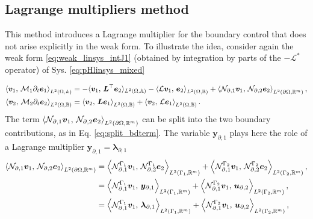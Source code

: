 \subsection{Lagrange multipliers method}\label{sec:lagrMul}
This method introduces a Lagrange multiplier for the boundary control that does not arise explicitly in the weak form. To illustrate the idea, consider again the weak form \ref{eq:weak_linsys_intJ1} (obtained by integration by parts of the $\mathcal{-L^*}$ operator) of Sys. \ref{eq:pHlinsys_mixed}

\begin{equation}\label{eq:pHlinsys_mixed_weak}
\begin{aligned}
\inner[L^2(\Omega, \mathbb{A})]{\bm{v}_1}{\mathcal{M}_1 \partial_t \bm{e}_1} &=   -  \langle{\bm{v}_1}, \,{\bm{L}^\top \bm{e}_2}\rangle_{L^2(\Omega, \mathbb{A})}  -\inner[L^2(\Omega, \mathbb{B})]{\mathcal{L}\bm{v}_1}{\bm{e}_2} + \inner[L^2({\partial\Omega}, \mathbb{R}^m)]{\mathcal{N}_{\partial, 1} \bm{v}_1}{\mathcal{N}_{\partial, 2}\bm{e}_2}, \\
\inner[L^2(\Omega, \mathbb{B})]{\bm{v}_2}{\mathcal{M}_2 \partial_t \bm{e}_2} &=   \inner[L^2(\Omega, \mathbb{B})]{\bm{v}_2}{\bm{L}\bm{e}_1} + \inner[L^2(\Omega, \mathbb{B})]{\bm{v}_2}{\mathcal{L}\bm{e}_1}. \\
\end{aligned}
\end{equation}
The term $\inner[L^2({\partial\Omega}, \mathbb{R}^m)]{\mathcal{N}_{\partial, 1} \bm{v}_1}{\mathcal{N}_{\partial, 2}\bm{e}_2}$ can be split into the two boundary contributions, as in Eq. \eqref{eq:split_bdterm}. The variable  $\bm{y}_{\partial, 1}$ plays here the role of a Lagrange multiplier $\bm{y}_{\partial, 1}=\bm{\lambda}_{\partial, 1}$
\begin{equation}\label{eq:bdterm_mixed}
\begin{aligned}
\inner[L^2({\partial\Omega}, \mathbb{R}^m)]{\mathcal{N}_{\partial, 1} \bm{v}_1}{\mathcal{N}_{\partial, 2}\bm{e}_2} &= \inner[L^2(\Gamma_1, \mathbb{R}^m)]{\mathcal{N}_{\partial, 1}^{\Gamma_1}\bm{v}_1}{\mathcal{N}_{\partial, 2}^{\Gamma_1}\bm{e}_2} + \inner[L^2(\Gamma_2, \mathbb{R}^m)]{\mathcal{N}_{\partial, 1}^{\Gamma_2}\bm{v}_1}{\mathcal{N}_{\partial, 2}^{\Gamma_2}\bm{e}_2}, \\
&= \inner[L^2(\Gamma_1, \mathbb{R}^m)]{\mathcal{N}_{\partial, 1}^{\Gamma_1}\bm{v}_1}{\bm{y}_{\partial, 1}} + \inner[L^2(\Gamma_2, \mathbb{R}^m)]{\mathcal{N}_{\partial, 1}^{\Gamma_2}\bm{v}_1}{\bm{u}_{\partial, 2}}, \\
&= \inner[L^2(\Gamma_1, \mathbb{R}^m)]{\mathcal{N}_{\partial, 1}^{\Gamma_1}\bm{v}_1}{\bm{\lambda}_{\partial, 1}} + \inner[L^2(\Gamma_2, \mathbb{R}^m)]{\mathcal{N}_{\partial, 1}^{\Gamma_2}\bm{v}_1}{\bm{u}_{\partial, 2}}, \\
\end{aligned}
\end{equation}
